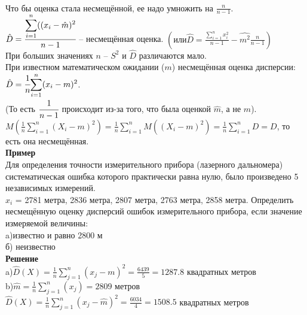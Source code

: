 \documentclass[russian, 12pt, fleqn]{article}
\begin{document}
\\
Что бы оценка стала несмещённой, ее надо умножить на $\frac{n}{n - 1}$.\\
$\hat{D} = \cfrac{\displaystyle{\sum \limits _{i = 1}^{n}( (x_i - \hat{m})^2 }}{n - 1}$ -- несмещённая оценка. $ \displaystyle{\left ( или \hat{D} = \frac{\sum \limits _{i = 1}^{n} x_i^2}{n - 1} - \hat{m^2} \frac{n}{n - 1}\right )}$\\
При больших значениях $n$ -- $S^2$ и $\hat{D}$ различаются мало.\\ При известном математическом ожидании ($m$) несмещённая оценка дисперсии:$\hat{D} = \cfrac{1}{n} \displaystyle{\sum \limits_{i=1}^{n}(x_i - m)^2}$.\\ (То есть $\cfrac{1}{n - 1}$ происходит из-за того, что была оценкой $\hat{m}$, а не $m$).\\
$ \displaystyle{M \left( \frac{1}{n} \sum \limits_{i = 1}^{n} (X_i - m)^2 \right) = \frac{1}{n} \displaystyle{\sum \limits_{i = 1}^{n}} M((X_i - m)^2) = \frac{1}{n} \displaystyle{\sum \limits_{i = 1}^{n}}  D = D}$,
{то есть она несмещённая.}\\
\textbf{Пример}\\
Для определения точности измерительного прибора (лазерного дальномера) систематическая ошибка которого практически равна нулю, было произведено 5 независимых измерений.\\
$x_i$  = 2781 метра, 2836 метра, 2807 метра, 2763 метра, 2858 метра. Определить несмещённую оценку дисперсий ошибок  измерительного прибора, если значение измеряемой величины:\\
a)известно и равно 2800 м\\
б) неизвестно\\
\textbf{Решение}\\
a)$\hat{D}(X) = \frac{1}{n} \displaystyle{\sum \limits_{j = 1}^{n}}(x_j - m)^2 = \frac{6439}{5} = 1287.8$ квадратных метров\\
b)$\hat{m} = \frac{1}{n} \displaystyle{\sum \limits_{j = 1}^{n}}(x_j)= 2809$  метров\\
$\hat{D}(X) = \frac{1}{n} \displaystyle{\sum \limits_{j = 1}^{n}}(x_j - \hat{m})^2 = \frac{6034}{4} = 1508.5$ квадратных метров\\
\end{document}
